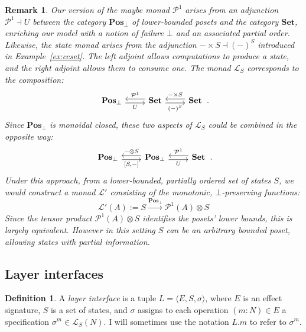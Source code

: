 \documentclass[11pt,oneside,draft]{book}
\newtheorem{remark}[theorem]{Remark}
\theoremstyle{definition}
\newtheorem{definition}[theorem]{Definition}
\begin{document}
\begin{remark}
Our version of the \emph{maybe} monad $\mathcal{P}^1$
arises from an adjunction $\mathcal{P}^1 \dashv U$
between the category $\mathbf{Pos}_\bot$
of lower-bounded posets
and the category $\mathbf{Set}$,
enriching our model with a notion of failure $\bot$
and an associated partial order.
Likewise,
the state monad arises from the adjunction
$- \times S \dashv (-)^S$
introduced in Example~\ref{ex:ccset}.
The left adjoint allows computations to produce a state,
and the right adjoint allows them to consume one.
The monad $\mathcal{L}_S$ corresponds to the composition:
\[
  \begin{tikzcd}
    \mathbf{Pos}_\bot
      \ar[r, "U"', shift right] &
    \mathbf{Set}
      \ar[l, "\mathcal{P}^1"', shift right]
      \ar[r, "(-)^S"', shift right] &
    \mathbf{Set}
      \ar[l, "- \times S"', shift right]
   \end{tikzcd}
  \,.
\]
Since $\mathbf{Pos}_\bot$ is monoidal closed,
these two aspects of $\mathcal{L}_S$
could be combined in the opposite way:
\[
  \begin{tikzcd}
    \mathbf{Pos}_\bot
      \ar[r, "{[S, {-}]}"', shift right] &
    \mathbf{Pos}_\bot
      \ar[l, "{-} \otimes S"', shift right]
      \ar[r, "U"', shift right] &
    \mathbf{Set}
      \ar[l, "\mathcal{P}^1"', shift right]
   \end{tikzcd}
  \,.
\]
Under this approach,
from a \emph{lower-bounded, partially ordered}
set of states $S$, we would construct a monad $\mathcal{L}'$
consisting of the \emph{monotonic, $\bot$-preserving} functions:
\[
  \mathcal{L}'(A) := S \xrightarrow{\mathbf{Pos}_\bot} \mathcal{P}^1(A) \otimes S
\]
Since the tensor product $\mathcal{P}^1(A) \otimes S$ identifies
the posets' lower bounds,
this is largely equivalent.
However in this setting $S$ can be an arbitrary bounded poset,
allowing states with partial information.
\end{remark}


\subsection{Layer interfaces} %

\begin{definition} %
A \emph{layer interface} is a tuple
$L = \langle E, S, \sigma \rangle$,
where $E$ is an effect signature,
$S$ is a set of states,
and $\sigma$ assigns to each operation
$(m \mathop: N) \in E$
a specification
$\sigma^m \in \mathcal{L}_S(N)$.
I will sometimes use the notation $L.m$
to refer to $\sigma^m$.
\end{definition}
\end{document}
